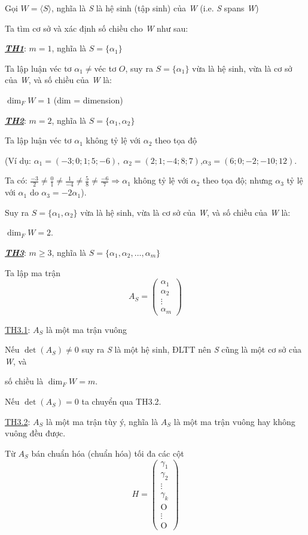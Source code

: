 \documentclass[12pt,a4paper]{article}
\newcommand{\ul}[1]{\uline{#1}}
\begin{document}
Gọi $W = \langle S \rangle$, nghĩa là \emph{S}
là hệ sinh (tập sinh) của \emph{W} (i.e. \emph{S} spans \emph{W})

Ta tìm cơ sở và xác định số chiều cho \emph{W} như sau:

\emph{\textbf{\ul{TH1}}}:
$m = 1$, nghĩa là
$S = \{ \alpha_1 \}$

Ta lập luận véc tơ $\alpha_1 \neq$véc
tơ $O$, suy ra
$S = \{ \alpha_1 \}$ vừa là hệ sinh, vừa là
cơ sở của \emph{W}, và số chiều của \emph{W} là:

$\dim_F W = 1$ (dim = dimension)

\emph{\textbf{\ul{TH2}}}:
$m = 2$, nghĩa là
$S = \{ \alpha_1, \alpha_2 \}$

Ta lập luận véc tơ $\alpha_1$
không tỷ lệ với $\alpha_2$ theo
tọa độ

(Ví dụ:
$\alpha_1 = (-3; 0; 1; 5; -6), \; \alpha_2 = (2; 1; -4; 8; 7)$,$\alpha_3 = (6; 0; -2; -10; 12)$.

Ta có: $\frac{-3}{2} \neq \frac{0}{1} \neq \frac{1}{-4} \neq \frac{5}{8} \neq \frac{-6}{7} \Rightarrow \alpha_1$ không tỷ lệ với
$\alpha_2$ theo tọa độ; nhưng
$\alpha_3$ tỷ lệ với
$\alpha_1$ do
$\alpha_3 = -2\alpha_1$).

Suy ra $S = \{\alpha_1, \alpha_2\}$ vừa là hệ sinh,
vừa là cơ sở của \emph{W}, và số chiều của \emph{W} là:

$\dim_F W = 2$.

\emph{\textbf{\ul{TH3}}}:
$m \ge 3$, nghĩa là
$S = \{\alpha_1, \alpha_2, \dots, \alpha_m\}$

Ta lập ma trận \[A_S = \begin{pmatrix} \alpha_1 \\ \alpha_2 \\ \vdots \\ \alpha_m \end{pmatrix}\]

\ul{TH3.1}: $A_S$ là một ma
trận vuông

Nếu $\det(A_S) \ne 0$ suy ra \emph{S} là
một hệ sinh, ĐLTT nên \emph{S} cũng là một cơ sở của \emph{W}, và

số chiều là $\dim_F W = m$.

Nếu $\det(A_S) = 0$ ta chuyển qua
TH3.2.

\ul{TH3.2}: $A_S$ là một ma
trận tùy ý, nghĩa là $A_S$
là một ma trận vuông hay không vuông đều được.

Từ $A_S$ bán chuẩn hóa
(chuẩn hóa) tối đa các cột
\[H = \begin{pmatrix} \gamma_1 \\ \gamma_2 \\ \vdots \\ \gamma_k \\ \text{O} \\ \vdots \\ \text{O} \end{pmatrix}\]
\end{document}

